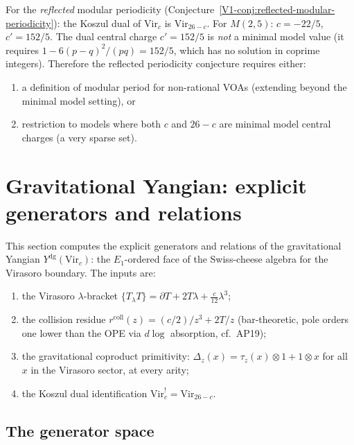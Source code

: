 \documentclass[11pt]{article}
\begin{document}
\begin{remark}
For the \emph{reflected} modular periodicity
(Conjecture~\ref*{V1-conj:reflected-modular-periodicity}):
the Koszul dual of $\mathrm{Vir}_c$ is $\mathrm{Vir}_{26-c}$.
For $M(2,5)$: $c = -22/5$, $c' = 152/5$.
The dual central charge $c' = 152/5$ is \emph{not} a minimal
model value (it requires $1 - 6(p-q)^2/(pq) = 152/5$, which
has no solution in coprime integers).  Therefore the reflected
periodicity conjecture requires either:
\begin{enumerate}[nosep]
\item a definition of modular period for non-rational VOAs
  (extending beyond the minimal model setting), or
\item restriction to models where both $c$ and $26-c$ are
  minimal model central charges (a very sparse set).
\end{enumerate}
\end{remark}




\section{Gravitational Yangian: explicit generators and relations}
\label{sec:gravitational-yangian-explicit}

This section computes the explicit generators and relations of the
gravitational Yangian $Y^{\mathrm{dg}}(\mathrm{Vir}_c)$: the
$E_1$-ordered face of the Swiss-cheese algebra for the Virasoro
boundary.  The inputs are:
\begin{enumerate}[label=(\arabic*)]
\item the Virasoro $\lambda$-bracket
  $\{T{}_\lambda T\} = \partial T + 2T\lambda + \frac{c}{12}\lambda^3$;
\item the collision residue
  $r^{\mathrm{coll}}(z) = (c/2)/z^3 + 2T/z$
  (bar-theoretic, pole orders one lower than the OPE via $d\log$
  absorption, cf.~AP19);
\item the gravitational coproduct primitivity:
  $\Delta_z(x) = \tau_z(x) \otimes 1 + 1 \otimes x$
  for all $x$ in the Virasoro sector, at every arity;
\item the Koszul dual identification
  $\mathrm{Vir}_c^! = \mathrm{Vir}_{26-c}$.
\end{enumerate}

\subsection{The generator space}
\end{document}

